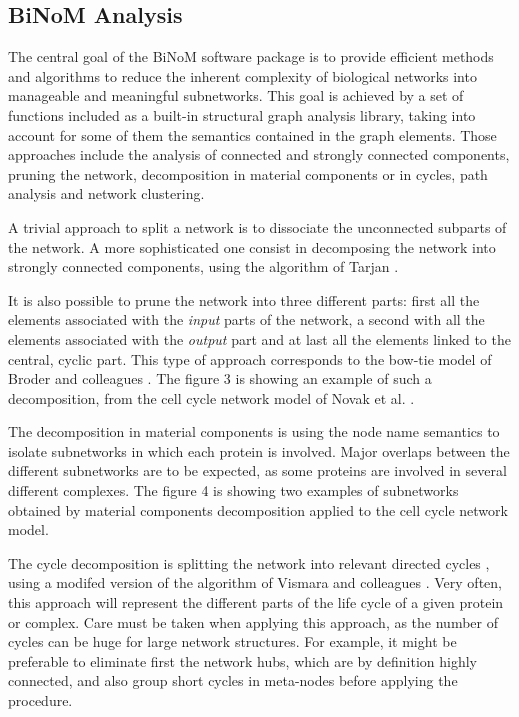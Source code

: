 \documentclass[10pt]{bmc_article}
\newenvironment{bmcformat}{\baselineskip20pt\sloppy\setboolean{publ}{false}}{\baselineskip20pt\sloppy}
\begin{document}
\begin{bmcformat}
\subsection*{BiNoM Analysis}
The central goal of the BiNoM software package is to provide efficient methods
and algorithms to reduce the inherent complexity of biological networks into
manageable and meaningful subnetworks. This goal is achieved by a set of
functions included as a built-in structural graph analysis library, taking into
account for some of them the semantics contained in the graph elements. Those
approaches include the analysis of connected and strongly connected components,
pruning the network, decomposition in material components or in cycles, path
analysis and network clustering.

A trivial approach to split a network is to dissociate the unconnected subparts
of the network. A more sophisticated one consist in decomposing the network into
strongly connected components, using the algorithm of Tarjan
\cite{tarjan1972depth}.

It is also possible to prune the network into three different parts:
first all the elements associated with the \emph{input} parts of the network, a
second with all the elements associated with the \emph{output} part and at last
all the elements linked to the central, cyclic part. This type of approach
corresponds to the bow-tie model of Broder and colleagues \cite{broder2000graph}.
The figure 3 is showing an example of such a decomposition, from the cell cycle
network model of Novak et al. \cite{novak1998model}.

The decomposition in material components is using the node name semantics to
isolate subnetworks in which each protein is involved. Major overlaps between
the different subnetworks are to be expected, as some proteins are involved in
several different complexes. The figure 4 is showing two examples of subnetworks
obtained by material components decomposition applied to the cell cycle network
model.

The cycle decomposition is splitting the network into relevant directed cycles
\cite{gleiss2001relevant}, using a modifed version of the algorithm of Vismara
and colleagues \cite{vismara1997union}. Very often, this approach will represent
the different parts of the life cycle of a given protein or complex. Care must
be taken when applying this approach, as the number of cycles can be huge for
large network structures. For example, it might be preferable to eliminate first
the network hubs, which are by definition highly connected, and also group short
cycles in meta-nodes before applying the procedure. 


\end{bmcformat}
\end{document}
